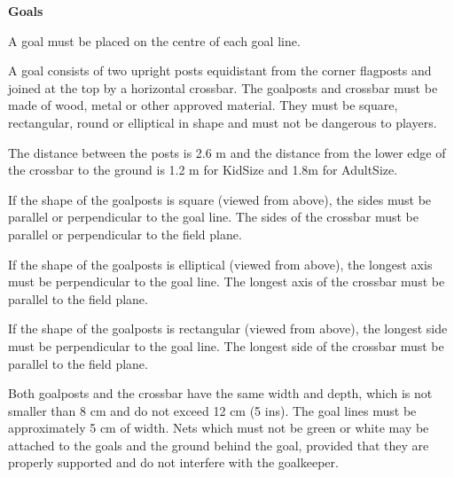 \bigskip

{\bfseries Goals }

\headlinebox

A goal must be placed on the centre of each goal line.


\bigskip

A goal consists of two upright posts equidistant from the corner flagposts and joined at the top by a horizontal crossbar. The goalposts and crossbar must be made of wood, metal or other approved material. They must be square, rectangular, round or elliptical in shape and must
not be dangerous to players.

\bigskip

The distance between the posts is 2.6 m and the distance from the lower edge of
the crossbar to the ground is 1.2 m for KidSize and 1.8m for AdultSize. 


\bigskip

If the shape of the goalposts is square (viewed from above), the sides must be parallel or perpendicular to the goal line. The sides of the crossbar must be parallel or perpendicular to the field plane.

\bigskip

If the shape of the goalposts is elliptical (viewed from above), the longest axis must be perpendicular to the goal line. The longest axis of the crossbar must be parallel to the field plane.

\bigskip

If the shape of the goalposts is rectangular (viewed from above), the longest side must be perpendicular to the goal line. The longest side of the crossbar must be parallel to the field plane.

\bigskip

Both goalposts and the crossbar have the same width and depth,
which is not smaller than 8 cm and do not exceed 12 cm (5 ins).
The goal lines must be approximately 5 cm of width. 
Nets which must not be green or white may be attached to the
goals and the ground behind the goal, provided that they are properly supported
and do not interfere with the goalkeeper.


